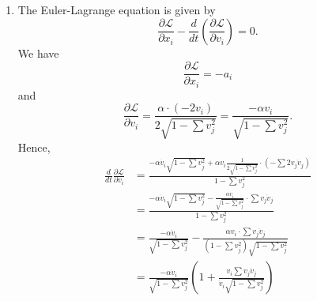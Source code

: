 \documentclass[a4paper]{article}
\theoremstyle{plain}
\begin{document}
\begin{enumerate}[label=(\roman*)]
	\item The Euler-Lagrange equation is given by
	\[
		\frac{\partial \mathcal L}{\partial x_i} - \frac{d}{dt}(\frac{\partial \mathcal L}{\partial v_i}) = 0.
	\]
	We have
	\[
		\frac{\partial \mathcal L}{\partial x_i} = -a_i
	\]
	and
	\[
		\frac{\partial \mathcal L}{\partial v_i} = \frac{\alpha \cdot (-2v_i)}{2\sqrt{1- \sum v_j^2}} = \frac{-\alpha v_i}{\sqrt{1- \sum v_j^2}}.
	\]
	Hence,
	\begin{align*}
		\frac{d}{dt}\frac{\partial \mathcal L}{\partial v_i} &= \frac{-\alpha \dot v_i \sqrt{1- \sum v_j^2} + \alpha v_i \frac{1}{2\sqrt{1- \sum v_j^2}} \cdot (- \sum 2v_j \dot v_j)}{1-\sum v_j^2} \\
		&= 
		\frac{-\alpha \dot v_i \sqrt{1- \sum v_j^2} -  \frac{\alpha v_i}{\sqrt{1- \sum v_j^2}} \cdot  \sum v_j \dot v_j}{1-\sum v_j^2} \\
		&= \frac{-\alpha \dot v_i}{ \sqrt{1- \sum v_j^2} }  -  \frac{\alpha v_i \cdot  \sum v_j \dot v_j}{(1-\sum v_j^2)\sqrt{1- \sum v_j^2}} \\
		&=  \frac{-\alpha \dot v_i}{ \sqrt{1- \sum v_j^2} }(1 + \frac{v_i\sum v_j \dot v_j}{\dot v_i\sqrt{1- \sum v_j^2}})
	\end{align*}
\end{enumerate}
\end{document}
